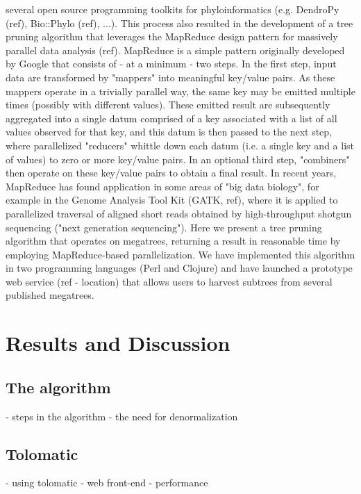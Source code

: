 \documentclass[10pt]{bmc_article}
\newenvironment{bmcformat}{\begin{raggedright}\baselineskip20pt\sloppy\setboolean{publ}{false}}{\end{raggedright}\baselineskip20pt\sloppy}
\begin{document}
\begin{bmcformat}
several open source programming toolkits for phyloinformatics (e.g. DendroPy (ref),
Bio::Phylo (ref), ...). This process also resulted in the development of a tree
pruning algorithm that leverages the MapReduce design pattern for massively 
parallel data analysis (ref). MapReduce is a simple pattern originally developed
by Google that consists of - at a minimum - two steps. In the first step, input
data are transformed by "mappers" into meaningful key/value pairs. As these 
mappers operate in a trivially parallel way, the same key may be emitted multiple 
times (possibly with different values). These emitted result are subsequently 
aggregated into a single datum comprised of a key associated with a list of 
all values observed for that key, and this datum is then passed to the next
step, where parallelized "reducers" whittle down each datum (i.e. a single key
and a list of values) to zero or more key/value pairs. In an optional third
step, "combiners" then operate on these key/value pairs to obtain a final result.
In recent years, MapReduce has found application in some areas of "big data
biology", for example in the Genome Analysis Tool Kit (GATK, ref), where it is
applied to parallelized traversal of aligned short reads obtained by high-throughput
shotgun sequencing ("next generation sequencing"). Here we present a tree pruning
algorithm that operates on megatrees, returning a result in reasonable time by
employing MapReduce-based parallelization. We have implemented this algorithm in
two programming languages (Perl and Clojure) and have launched a prototype web
service (ref - location) that allows users to harvest subtrees from several 
published megatrees.

\section*{Results and Discussion}

  \subsection*{The algorithm}
  - steps in the algorithm
  - the need for denormalization  

  \subsection*{Tolomatic}
  - using tolomatic
  - web front-end
  - performance


\end{bmcformat}
\end{document}
